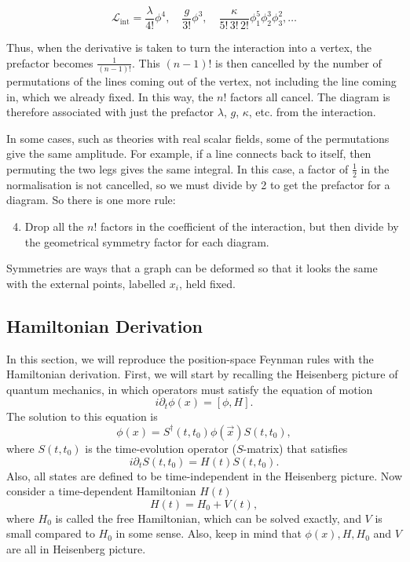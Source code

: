 \documentclass[11pt]{article}
\theoremstyle{definition}
\begin{document}
\[
\mathcal{L}_{\text{int}} = \frac{\lambda}{4!} \phi^4, \quad \frac{g}{3!} \phi^3, \quad \frac{\kappa}{5!\,3!\,2!} \phi_1^5 \phi_2^3 \phi_3^2, \ldots
\tag{7.24}
\]

Thus, when the derivative is taken to turn the interaction into a vertex, the prefactor becomes $\frac{1}{(n-1)!}$. This $(n-1)!$ is then cancelled by the number of permutations of the lines coming out of the vertex, not including the line coming in, which we already fixed. In this way, the $n!$ factors all cancel. The diagram is therefore associated with just the prefactor $\lambda$, $g$, $\kappa$, etc. from the interaction.

In some cases, such as theories with real scalar fields, some of the permutations give the same amplitude. For example, if a line connects back to itself, then permuting the two legs gives the same integral. In this case, a factor of $\frac{1}{2}$ in the normalisation is not cancelled, so we must divide by 2 to get the prefactor for a diagram. So there is one more rule:

\begin{enumerate}
\setcounter{enumi}{3}
\item Drop all the $n!$ factors in the coefficient of the interaction, but then divide by the geometrical symmetry factor for each diagram.
\end{enumerate}

Symmetries are ways that a graph can be deformed so that it looks the same with the external points, labelled $x_i$, held fixed.

\subsection{Hamiltonian Derivation}
In this section, we will reproduce the position-space Feynman rules with the Hamiltonian derivation. First, we will start by recalling the Heisenberg picture of quantum mechanics, in which operators must satisfy the equation of motion
\begin{equation}
    i\partial_t\phi(x) = [\phi, H].
\end{equation}
The solution to this equation is
\begin{equation}
    \phi(x) = S^\dagger(t,t_0)\phi(\vec{x})S(t,t_0),
    \label{Eq. Heisenberg}
\end{equation}
where $S(t,t_0)$ is the time-evolution operator ($S$-matrix) that satisfies
\begin{equation}
    i\partial_tS(t,t_0) = H(t)S(t,t_0).
    \label{Eq. Heisenberg 2}
\end{equation}
Also, all states are defined to be time-independent in the Heisenberg picture. Now consider a time-dependent Hamiltonian $H(t)$
\begin{equation}
    H(t) = H_0 + V(t),
\end{equation}
where $H_0$ is called the free Hamiltonian, which can be solved exactly, and $V$ is small compared to $H_0$ in some sense. Also, keep in mind that $\phi(x), H, H_0$ and $V$ are all in Heisenberg picture.
\end{document}
